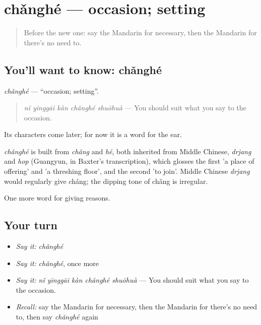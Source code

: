 \section[chǎnghé]{chǎnghé — occasion; setting}

\label{lesson:ZH-C360-changhe}



\begin{quote}
Before the new one: say the Mandarin for necessary, then the Mandarin for there's no need to.
\end{quote}

\subsection*{You'll want to know: chǎnghé}
\emph{chǎnghé} — \textquotedblleft{}occasion; setting\textquotedblright{}.

\begin{quote}
\emph{nǐ yīnggāi kàn chǎnghé shuōhuà} — You should suit what you say to the occasion.
\end{quote}

Its characters come later; for now it is a word for the ear.

\begin{cousinweb}
\emph{chǎnghé} is built from \emph{chǎng} and \emph{hé}, both inherited from Middle Chinese, \emph{drjang} and \emph{hop} (Guangyun, in Baxter's transcription), which glosses the first 'a place of offering' and 'a threshing floor', and the second 'to join'. Middle Chinese \emph{drjang} would regularly give cháng; the dipping tone of chǎng is irregular.
\end{cousinweb}

\begin{grammarlens}[title={What you've built}]
One more word for giving reasons.
\end{grammarlens}

\subsection*{Your turn}
\begin{itemize}
\raggedright
  \item \emph{Say it:} \emph{chǎnghé}
  \item \emph{Say it:} \emph{chǎnghé}, once more
  \item \emph{Say it:} \emph{nǐ yīnggāi kàn chǎnghé shuōhuà} — You should suit what you say to the occasion.
  \item \emph{Recall:} say the Mandarin for necessary, then the Mandarin for there's no need to, then say \emph{chǎnghé} again
\end{itemize}

